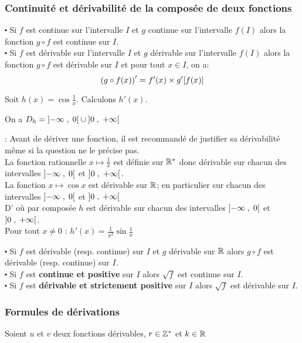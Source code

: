 \subsubsection*{Continuité et dérivabilité de la composée de deux fonctions}
\begin{property}
$ \centerdot $ Si $ f $ est continue sur l'intervalle $ I $ et $ g $ continue sur l'intervalle $ f(I) $ alors la fonction $ g\circ f $ est continue sur  $ I $.\\
$ \centerdot $ Si $ f $ est dérivable sur l'intervalle $ I $ et $ g $ dérivable sur l'intervalle $ f(I) $ alors la fonction $ g\circ f $ est dérivable sur $ I $ et pour tout $ x\in I $, on a:
\[\left(g\circ f(x)\right)'= f'(x)\times g'[f(x)] \]
\end{property}
\begin{example} 
Soit $h(x)= \cos \frac{1}{x}$. Calculons  $h'(x) $.

On a   $D_{h}= \left]-\infty \;,\; 0\right[\cup \left]0 \;,\; +\infty\right[ $

\textbf{\color{red}{Attention}}:  Avant de dériver une fonction, il est recommandé de justifier sa dérivabilité même si la question ne le précise pas.\\
La fonction rationnelle $ x\mapsto \frac{1}{x} $ est  définie sur $ \mathbb{R}^* $ donc dérivable sur chacun des intervalles $\left]-\infty \;,\; 0\right[ $ et $\left]0 \;,\; +\infty\right[. $\\
La fonction $ x\mapsto \cos x $ est dérivable sur $ \mathbb{R} $; en particulier sur chacun des intervalles $\left]-\infty \;,\; 0\right[ $ et $\left]0 \;,\; +\infty\right[ $\\ D' où par  composée $ h $ est dérivable  sur chacun des intervalles $\left]-\infty \;,\; 0\right[ $ et $\left]0 \;,\; +\infty\right[ $.\\
Pour tout   $ x\neq 0 $  \quad :    $h'(x)=\frac{1}{x^{2}}\sin \frac{1}{x} $ 

\end{example}
\begin{corollary}
$ \centerdot $ Si $ f $ est dérivable  (resp. continue) sur $ I $  et $ g $ dérivable sur $ \mathbb{R} $  alors $ g \circ f $ est dérivable (resp. continue) sur $ I. $\\
$ \centerdot $ Si $ f $ est \textbf{ continue et positive} sur $ I $ alors $ \sqrt{f} $ est continue sur $ I $.\\
$ \centerdot $ Si $ f $ est \textbf{ dérivable et strictement positive } sur $ I $ alors $ \sqrt{f} $ est dérivable sur $ I $.
\end{corollary}


\subsubsection*{Formules de dérivations}
Soient $u $ et $v $ deux fonctions dérivables, $ r\in\mathbb{Z}^* $ et $ k\in\mathbb{R} $\\

